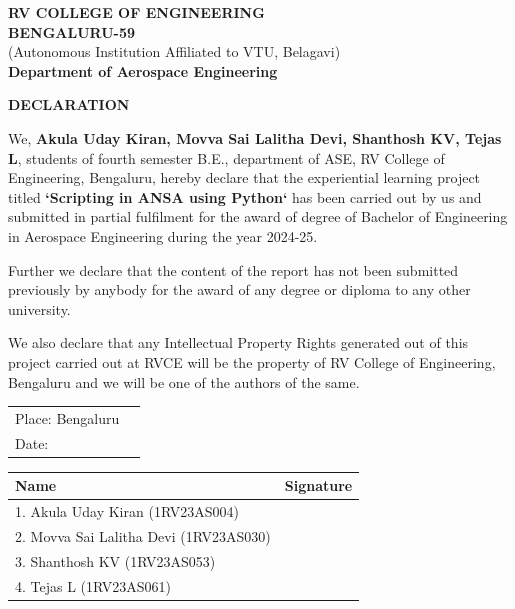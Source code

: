 \documentclass{book}
\begin{document}
\newpage
\thispagestyle{empty}

\begin{center}
{\large \textbf{RV COLLEGE OF ENGINEERING}}\\
\vspace{0.25cm}
\textbf{BENGALURU-59}\\
\vspace{0.25cm}
{\small (Autonomous Institution Affiliated to VTU, Belagavi)}\\
\vspace{0.25cm}
{\large \textbf{Department of Aerospace Engineering}}

\vspace{1cm}
{\Large \textbf{DECLARATION}}
\end{center}

\vspace{1.5cm}

We, \textbf{Akula Uday Kiran, Movva Sai Lalitha Devi, Shanthosh KV, Tejas L}, students of fourth semester B.E., department of ASE, RV College of Engineering, Bengaluru, hereby declare that the experiential learning project titled \textbf{`Scripting in ANSA using Python`} has been carried out by us and submitted in partial fulfilment for the award of degree of Bachelor of Engineering in Aerospace Engineering during the year 2024-25.

Further we declare that the content of the report has not been submitted previously by anybody for the award of any degree or diploma to any other university.

We also declare that any Intellectual Property Rights generated out of this project carried out at RVCE will be the property of RV College of Engineering, Bengaluru and we will be one of the authors of the same.

\vspace{1cm}

\begin{tabular}{ll}
Place: Bengaluru & \\
Date: & \\
\end{tabular}

\vspace{2cm}

\begin{tabular}{|p{}|p{}|}
\hline
\textbf{Name} & \textbf{Signature} \\
\hline
1. Akula Uday Kiran (1RV23AS004) & \\
\hline
2. Movva Sai Lalitha Devi (1RV23AS030) & \\
\hline
3. Shanthosh KV (1RV23AS053) & \\
\hline
4. Tejas L (1RV23AS061) & \\
\hline
\end{tabular}
\end{document}
